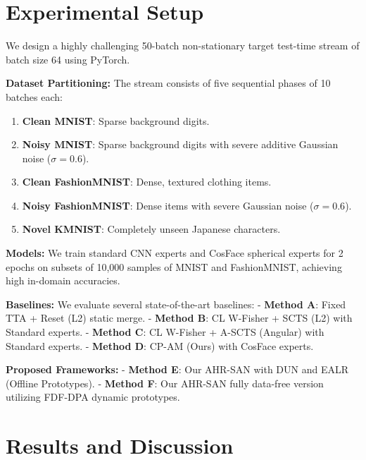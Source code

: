 \documentclass{article}
\theoremstyle{plain}
\theoremstyle{definition}
\theoremstyle{remark}
\begin{document}
\section{Experimental Setup}
We design a highly challenging 50-batch non-stationary target test-time stream of batch size 64 using PyTorch.

\textbf{Dataset Partitioning:} The stream consists of five sequential phases of 10 batches each:
\begin{enumerate}
    \item \textbf{Clean MNIST}: Sparse background digits.
    \item \textbf{Noisy MNIST}: Sparse background digits with severe additive Gaussian noise ($\sigma = 0.6$).
    \item \textbf{Clean FashionMNIST}: Dense, textured clothing items.
    \item \textbf{Noisy FashionMNIST}: Dense items with severe Gaussian noise ($\sigma = 0.6$).
    \item \textbf{Novel KMNIST}: Completely unseen Japanese characters.
\end{enumerate}

\textbf{Models:} We train standard CNN experts and CosFace spherical experts for 2 epochs on subsets of 10,000 samples of MNIST and FashionMNIST, achieving high in-domain accuracies.

\textbf{Baselines:} We evaluate several state-of-the-art baselines:
- \textbf{Method A}: Fixed TTA + Reset (L2) static merge.
- \textbf{Method B}: CL W-Fisher + SCTS (L2) with Standard experts.
- \textbf{Method C}: CL W-Fisher + A-SCTS (Angular) with Standard experts.
- \textbf{Method D}: CP-AM (Ours) with CosFace experts.

\textbf{Proposed Frameworks:}
- \textbf{Method E}: Our AHR-SAN with DUN and EALR (Offline Prototypes).
- \textbf{Method F}: Our AHR-SAN fully data-free version utilizing FDF-DPA dynamic prototypes.

\section{Results and Discussion}
\end{document}
